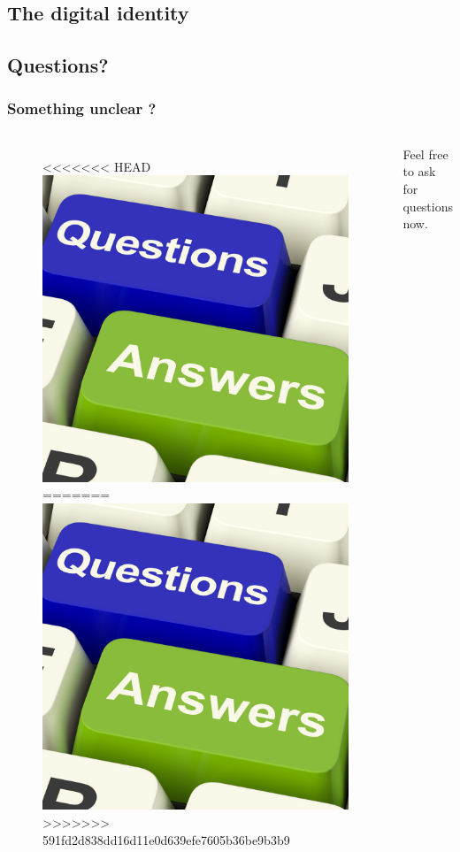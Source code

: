 \documentclass{beamer}
\begin{document}
\subsection{The digital identity}
\begin{frame}
\end{frame}

\subsection{Questions?}
\begin{frame}
\frametitle{Something unclear ?}
\begin{columns}[c]
\begin{figure}
<<<<<<< HEAD
\includegraphics[width=0.8\linewidth]{./materials/questions.jpg}
=======
\includegraphics[width=0.8\linewidth]{./materials/questions}
>>>>>>> 591fd2d838dd16d11e0d639efe7605b36be9b3b9
\end{figure}
Feel free to ask for questions now.
\end{columns}
\end{frame}
\end{document}
